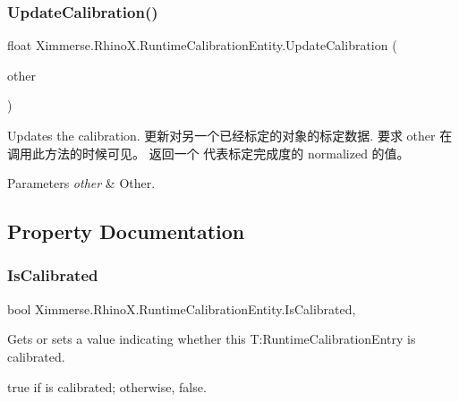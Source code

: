 \subsubsection{\texorpdfstring{Update\+Calibration()}{UpdateCalibration()}}
{\footnotesize\ttfamily float Ximmerse.\+Rhino\+X.\+Runtime\+Calibration\+Entity.\+Update\+Calibration (\begin{DoxyParamCaption}\item[{\mbox{\hyperlink{class_ximmerse_1_1_rhino_x_1_1_runtime_calibration_entity}{Runtime\+Calibration\+Entity}}}]{other }\end{DoxyParamCaption})}



Updates the calibration. 更新对另一个已经标定的对象的标定数据. 要求 other 在调用此方法的时候可见。 返回一个 代表标定完成度的 normalized 的值。 


\begin{DoxyParams}{Parameters}
{\em other} & Other.\\
\hline
\end{DoxyParams}


\subsection{Property Documentation}
\mbox{\label{class_ximmerse_1_1_rhino_x_1_1_runtime_calibration_entity_a4089f89a884f71bd451b27d38ab978d0}} 
\subsubsection{\texorpdfstring{Is\+Calibrated}{IsCalibrated}}
{\footnotesize\ttfamily bool Ximmerse.\+Rhino\+X.\+Runtime\+Calibration\+Entity.\+Is\+Calibrated\hspace{0.3cm}{\ttfamily [get]}, {\ttfamily [set]}}



Gets or sets a value indicating whether this T\+:\+Runtime\+Calibration\+Entry is calibrated. 

{\ttfamily true} if is calibrated; otherwise, {\ttfamily false}.\mbox{\label{class_ximmerse_1_1_rhino_x_1_1_runtime_calibration_entity_ad9cfbd99981ebb2a69e1c5e8d6f5c92d}} 
